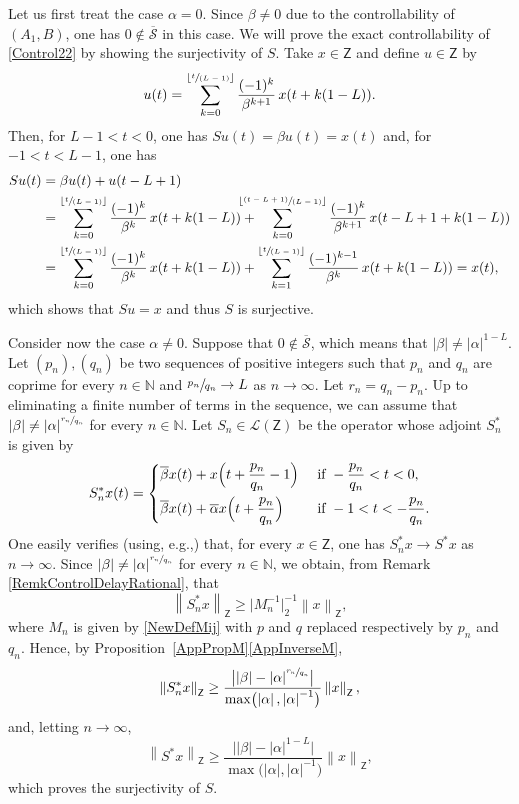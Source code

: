 \documentclass[JEP,XML,SOM,Unicode]{cedram}
\newcommand{\spfrac}[2]{\sfrac{#1}{(#2)}}
\newcommand{\pspfrac}[2]{\sfrac{(#1)}{(#2)}}
\renewcommand{\eg}{e.g.,\xspace}
\theoremstyle{plain}
\theoremstyle{definition}
\newcommand{\norm}[1]{\left\lVert #1\right\lVert}
\newcommand{\abs}[1]{\left\lvert #1\right \rvert}
\newcommand{\floor}[1]{\left\lfloor #1 \right\rfloor}
\newcommand{\babs}[1]{\bigl\lvert #1\bigr \rvert}
\newcommand{\nabs}[1]{\lvert #1 \rvert}
\begin{document}
Let us first treat the case $\alpha = 0$. Since $\beta \neq 0$ due to the controllability of $(A_1, B)$, one has $0 \notin \overline{\mathcal S}$ in this case. We will prove the exact controllability of \eqref{Control22} by showing the surjectivity of $S$. Take $x \in \mathsf Z$ and define $u \in \mathsf Z$ by
\[u(t) = \sum_{k=0}^{\floor{\spfrac{t}{L - 1}}} \frac{(-1)^k}{\beta^{k+1}}\, x(t + k(1 - L)).\]
Then, for $L - 1 < t < 0$, one has $S u(t) = \beta u(t) = x(t)$ and, for $-1 < t < L-1$, one has
\begin{align*}
S u(t) & = \beta u(t) + u(t - L + 1)  \\
& = \sum_{k=0}^{\floor{\spfrac{t}{L - 1}}} \frac{(-1)^k}{\beta^{k}}\, x(t + k(1 - L)) +\hspace*{-5mm} \sum_{k=0}^{\floor{\pspfrac{t - L + 1}{L - 1}}} \frac{(-1)^k}{\beta^{k+1}}\, x(t - L + 1 + k(1 - L))  \\
& = \sum_{k=0}^{\floor{\spfrac{t}{L - 1}}} \frac{(-1)^k}{\beta^{k}}\, x(t + k(1 - L)) + \sum_{k=1}^{\floor{\spfrac{t}{L - 1}}} \frac{(-1)^{k-1}}{\beta^{k}}\, x(t + k(1 - L)) = x(t),
\end{align*}
which shows that $S u = x$ and thus $S$ is surjective.

Consider now the case $\alpha \neq 0$. Suppose that $0 \notin \overline{\mathcal S}$, which means that $\abs{\beta} \neq \abs{\alpha}^{1-L}$. Let $(p_n), (q_n)$ be two sequences of positive integers such that $p_n$ and $q_n$ are coprime for every $n \in \mathbb N$ and $\sfrac{p_n}{q_n} \to L$ as $n \to \infty$. Let $r_n = q_n - p_n$. Up to eliminating a finite number of terms in the sequence, we can assume that $\abs{\beta} \neq \abs{\alpha}^{\sfrac{r_n}{q_n}}$ for every $n \in \mathbb N$. Let $S_n \in \mathcal L(\mathsf Z)$ be the operator whose adjoint $S_n^\ast$ is given by
\begin{equation*}
S_n^\ast x(t) =
\begin{dcases}
\overline\beta x(t) + x\Bigl(t + \frac{p_n}{q_n} - 1\Bigr) & \text{ if } -\frac{p_n}{q_n} < t < 0, \\
\overline\beta x(t) + \overline\alpha x\Bigl(t + \frac{p_n}{q_n}\Bigr) & \text{ if } -1 < t < -\frac{p_n}{q_n}.
\end{dcases}
\end{equation*}
One easily verifies (using, \eg \cite[Th.\,9.5]{Rudin1987Real}) that, for every $x \in \mathsf Z$, one has $S_n^\ast x \to S^\ast x$ as $n \to \infty$. Since $\abs{\beta} \neq \abs{\alpha}^{\sfrac{r_n}{q_n}}$ for every $n \in \mathbb N$, we obtain, from Remark \ref{RemkControlDelayRational}, that
\[\norm{S_n^\ast x}_{\mathsf Z} \geq \nabs{M_n^{-1}}_{2}^{-1} \norm{x}_{\mathsf Z},\]
where $M_n$ is given by \eqref{NewDefMij} with $p$ and $q$ replaced respectively by $p_n$ and $q_n$. Hence, by Proposition~\ref{AppPropM}\eqref{AppInverseM},
\[\norm{S_n^\ast x}_{\mathsf Z} \geq \frac{\babs{\abs{\beta} - \abs{\alpha}^{\sfrac{r_n}{q_n}}}}{\max\bigl(\abs{\alpha}, \abs{\alpha}^{-1}\bigr)} \norm{x}_{\mathsf Z},\]
and, letting $n \to \infty$,
\[\norm{S^\ast x}_{\mathsf Z} \geq \frac{\babs{\abs{\beta} - \abs{\alpha}^{1-L}}}{\max\bigl(\abs{\alpha}, \abs{\alpha}^{-1}\bigr)} \norm{x}_{\mathsf Z},\]
which proves the surjectivity of $S$.
\end{document}
